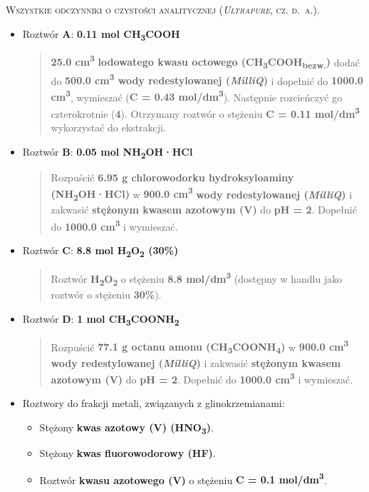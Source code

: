 \documentclass[
  letterpaper,
  DIV=11,
  numbers=noendperiod]{scrreprt}
\begin{document}
\textsc{Wszystkie odczynniki o czystości analitycznej (\emph{Ultrapure},
cz. d.~a.).}

\begin{itemize}
\item
  Roztwór \textbf{A}: \textbf{0.11 mol CH\textsubscript{3}COOH}

  \begin{quote}
  \textbf{25.0 cm\textsuperscript{3}} \textbf{lodowatego kwasu octowego
  (CH\textsubscript{3}COOH\textsubscript{bezw.})} dodać do \textbf{500.0
  cm\textsuperscript{3} wody redestylowanej (\emph{MilliQ})} i dopełnić
  do \textbf{1000.0 cm\textsuperscript{3}}, wymieszać (\textbf{C = 0.43
  mol/dm\textsuperscript{3}}). Następnie rozcieńczyć go czterokrotnie
  (\textbf{4}). Otrzymany roztwór o stężeniu \textbf{C = 0.11
  mol/dm\textsuperscript{3}} wykorzystać do ekstrakcji.
  \end{quote}
\item
  Roztwór \textbf{B}: \textbf{0.05 mol NH\textsubscript{2}OH·HCl}

  \begin{quote}
  Rozpuścić \textbf{6.95 g chlorowodorku hydroksyloaminy
  (NH\textsubscript{2}OH·HCl)} w \textbf{900.0 cm\textsuperscript{3}}
  \textbf{wody redestylowanej (\emph{MilliQ})} i zakwasić
  \textbf{stężonym kwasem azotowym (V)} do \textbf{pH = 2}. Dopełnić do
  \textbf{1000.0 cm\textsuperscript{3}} i wymieszać.
  \end{quote}
\item
  Roztwór \textbf{C}: \textbf{8.8 mol
  H\textsubscript{2}O\textsubscript{2} (30\%)}

  \begin{quote}
  Roztwór \textbf{H\textsubscript{2}O\textsubscript{2}} o stężeniu
  \textbf{8.8 mol/dm\textsuperscript{3}} (dostępny w handlu jako roztwór
  o stężeniu \textbf{30\%}).
  \end{quote}
\item
  Roztwór \textbf{D}: \textbf{1 mol
  CH\textsubscript{3}COONH\textsubscript{2}}

  \begin{quote}
  Rozpuścić \textbf{77.1 g octanu amonu
  (CH\textsubscript{3}COONH\textsubscript{4})} w \textbf{900.0
  cm\textsuperscript{3}} \textbf{wody redestylowanej (\emph{MilliQ})} i
  zakwasić \textbf{stężonym kwasem azotowym (V)} do \textbf{pH = 2}.
  Dopełnić do \textbf{1000.0 cm\textsuperscript{3}} i wymieszać.
  \end{quote}
\item
  Roztwory do frakcji metali, związanych z glinokrzemianami:

  \begin{itemize}
  \item
    Stężony \textbf{kwas azotowy (V) (HNO\textsubscript{3})}.
  \item
    Stężony \textbf{kwas fluorowodorowy (HF)}.
  \item
    Roztwór \textbf{kwasu azotowego (V)} o stężeniu \textbf{C = 0.1
    mol/dm\textsuperscript{3}}.
  \end{itemize}
\end{itemize}
\end{document}
